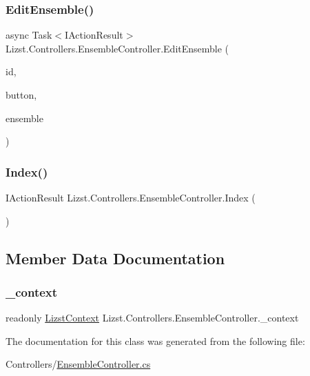 \subsubsection{\texorpdfstring{EditEnsemble()}{EditEnsemble()}\hspace{0.1cm}{\footnotesize\ttfamily [2/2]}}
{\footnotesize\ttfamily async Task$<$I\+Action\+Result$>$ Lizst.\+Controllers.\+Ensemble\+Controller.\+Edit\+Ensemble (\begin{DoxyParamCaption}\item[{int}]{id,  }\item[{string}]{button,  }\item[{\mbox{[}\+Bind(\char`\"{}\+Ensemble\+Id\char`\"{},\char`\"{}\+Ensemble\+Name\char`\"{},\char`\"{}\+Year\char`\"{},\char`\"{}\+Conductor\char`\"{})\mbox{]} \mbox{\hyperlink{class_lizst_1_1_models_1_1_ensemble}{Ensemble}}}]{ensemble }\end{DoxyParamCaption})}

\mbox{\label{class_lizst_1_1_controllers_1_1_ensemble_controller_aaf84c65828533cb459c6dbcb6b58525d}} 
\subsubsection{\texorpdfstring{Index()}{Index()}}
{\footnotesize\ttfamily I\+Action\+Result Lizst.\+Controllers.\+Ensemble\+Controller.\+Index (\begin{DoxyParamCaption}{ }\end{DoxyParamCaption})}



\subsection{Member Data Documentation}
\mbox{\label{class_lizst_1_1_controllers_1_1_ensemble_controller_a00698052da9bcfaafa14a8cb6df966f9}} 
\subsubsection{\texorpdfstring{\_context}{\_context}}
{\footnotesize\ttfamily readonly \mbox{\hyperlink{class_lizst_1_1_models_1_1_lizst_context}{Lizst\+Context}} Lizst.\+Controllers.\+Ensemble\+Controller.\+\_\+context}



The documentation for this class was generated from the following file\+:\begin{DoxyCompactItemize}
\item 
Controllers/\mbox{\hyperlink{_ensemble_controller_8cs}{Ensemble\+Controller.\+cs}}\end{DoxyCompactItemize}
